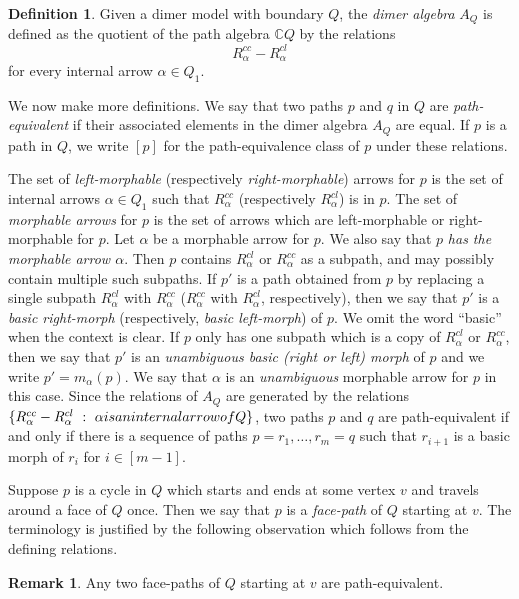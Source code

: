\documentclass{article}
\theoremstyle{definition}
\newtheorem{defn}[thm]{Definition}
\newtheorem{remk}[thm]{Remark}
\begin{document}
\begin{defn}\label{defn:dimer-algebra}
    Given a dimer model with boundary $Q$, the \textit{dimer algebra} $A_Q$ is defined as the quotient of the path algebra $\mathbb CQ$ by the relations
	\[R_\alpha^{cc}-R_\alpha^{cl}\]
    for every internal arrow $\alpha\in Q_1$.
\end{defn}

We now make more definitions. We say that two paths $p$ and $q$ in $Q$ are \textit{path-equivalent} if their associated elements in the dimer algebra $A_Q$ are equal. If $p$ is a path in $Q$, we write $[p]$ for the path-equivalence class of $p$ under these relations.

The set of \textit{left-morphable} (respectively \textit{right-morphable}) arrows for $p$ is the set of internal arrows $\alpha\in Q_1$ such that $R_\alpha^{cc}$ (respectively $R_\alpha^{cl}$) is in $p$. The set of \textit{morphable arrows} for $p$ is the set of arrows which are left-morphable or right-morphable for $p$. 
Let $\alpha$ be a morphable arrow for $p$. We also say that $p$ \textit{has the morphable arrow $\alpha$}. Then $p$ contains $R_\alpha^{cl}$ or $R_\alpha^{cc}$ as a subpath, and may possibly contain multiple such subpaths. If $p'$ is a path obtained from $p$ by replacing a single subpath $R_\alpha^{cl}$ with $R_\alpha^{cc}$ ($R_\alpha^{cc}$ with $R_\alpha^{cl}$, respectively), then we say that $p'$ is a \textit{basic right-morph} (respectively, \textit{basic left-morph}) of $p$. We omit the word ``basic'' when the context is clear. If $p$ only has one subpath which is a copy of $R_\alpha^{cl}$ or $R_\alpha^{cc}$, then we say that $p'$ is an \textit{unambiguous basic (right or left) morph} of $p$ and we write $p'=m_\alpha(p)$. We say that $\alpha$ is an \emph{unambiguous} morphable arrow for $p$ in this case.
Since the relations of $A_Q$ are generated by the relations $\{R_\alpha^{cc}-R_\alpha^{cl}\ :\ \alpha\textup{ is an internal arrow of }Q\}$, two paths $p$ and $q$ are path-equivalent if and only if 
there is a sequence of paths $p=r_1,\dots,r_m=q$ such that $r_{i+1}$ is a basic morph of $r_i$ for $i\in[m-1]$. 

Suppose $p$ is a cycle in $Q$ which starts and ends at some vertex $v$ and travels around a face of $Q$ once. Then we say that $p$ is a \textit{face-path} of $Q$ starting at $v$. The terminology is justified by the following observation which follows from the defining relations.

\begin{remk}\label{faces-are-equivalent}
    Any two face-paths of $Q$ starting at $v$ are path-equivalent.
\end{remk}
\end{document}
